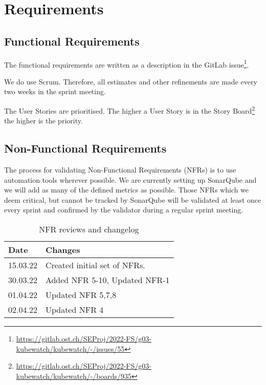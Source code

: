 \chapter{Requirements}

\section{Functional Requirements}
\label{functional-requirements}
The functional requirements are written as a description in the GitLab issue\footnote{\url{https://gitlab.ost.ch/SEProj/2022-FS/g03-kubewatch/kubewatch/-/issues/55}}.

We do use Scrum.
Therefore, all estimates and other refinements are made every two weeks in the sprint meeting.

The User Stories are prioritised.
The higher a User Story is in the Story Board\footnote{\url{https://gitlab.ost.ch/SEProj/2022-FS/g03-kubewatch/kubewatch/-/boards/935}} the higher is the priority.


\section{Non-Functional Requirements}
\label{section:non-functional-requirements}
The process for validating Non-Functional Requirements (NFRs) is to use automation tools wherever possible. We are currently setting up SonarQube and we will add as many of the defined metrics as possible. Those NFRs which we deem critical, but cannot be tracked by SonarQube will be validated at least once every sprint and confirmed by the validator during a regular sprint meeting.

\begin{table}[h!]
    \centering
      \caption{\label{tab:nfr-review}NFR reviews and changelog}
      \begin{tabular}{ | l | l | }
        \hline
        \textbf{Date} & \textbf{Changes} \\
        \hline
        15.03.22 & Created initial set of NFRs. \\
        \hline
        30.03.22 & Added NFR 5-10, Updated NFR-1 \\
        \hline
        01.04.22 & Updated NFR 5,7,8 \\
        \hline
        02.04.22 & Updated NFR 4 \\
        \hline
      \end{tabular}
    \end{table}

